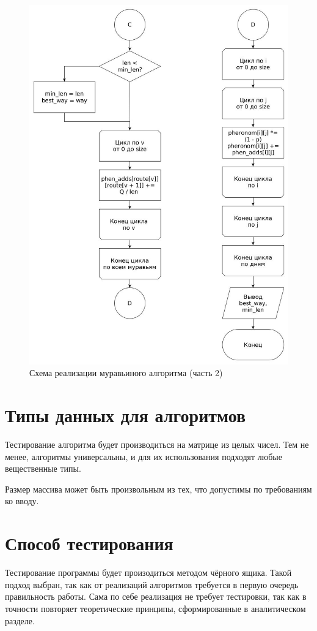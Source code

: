 \FloatBarrier
\begin{figure}[hp]
	\begin{center}
		\includegraphics[width=\linewidth]{graph/ant2.jpg}
	\end{center}
	\caption{Схема реализации муравьиного алгоритма (часть 2)}
\end{figure}
\FloatBarrier

\section{Типы данных для алгоритмов}
Тестирование алгоритма будет производиться на матрице из целых чисел.
Тем не менее, алгоритмы универсальны, и для их использования
подходят любые вещественные типы.

Размер массива может быть произвольным из тех, что допустимы по требованиям ко вводу.

\section{Способ тестирования}
Тестирование программы будет произодиться методом чёрного ящика.
Такой подход выбран, так как от реализаций алгоритмов требуется в первую
очередь правильность работы.
Сама по себе реализация не требует тестировки, так как в точности
повторяет теоретические принципы, сформированные в аналитическом
разделе.

